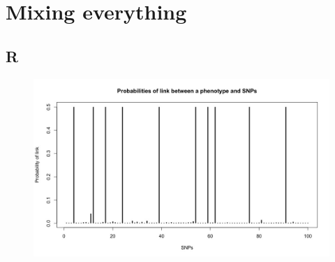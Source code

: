 \section{Mixing everything}
\subsection{R}
\begin{figure}[h]
\includegraphics[width=4.5in]{images/linkProba.jpeg}
\label{fig:linkProba}
\end{figure}
